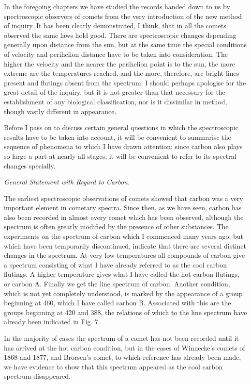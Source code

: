 \documentclass[a4paper, 12pt, oneside, polutonikogreek, english]{article}
\begin{document}
In the foregoing chapters we have studied the records handed down to us by spectroscopic observers of comets from the very introduction of the new method of inquiry. It has been clearly demonstrated, I think, that in all the comets observed the same laws hold good. There are spectroscopic changes depending generally upon distance from the sun, but at the same time the special conditions of velocity and perihelion distance have to be taken into consideration. The higher the velocity and the nearer the perihelion point is to the sun, the more extreme are the temperatures reached, and the more, therefore, are bright lines present and flutings absent from the spectrum. I should perhaps apologise for the great detail of the inquiry, but it is not greater than that necessary for the establishment of any biological classification, nor is it dissimilar in method, though vastly different in appearance.

Before I pass on to discuss certain general questions in which the spectroscopic results have to be taken into account, it will be convenient to summarise the sequence of phenomena to which I have drawn attention; since carbon also plays so large a part at nearly all stages, it will be convenient to refer to its spectral changes specially.

\emph{General Statement with Regard to Carbon.}

The earliest spectroscopic observations of comets showed that carbon was a very important element in cometary spectra. Since then, as we have seen, carbon has also been recorded in almost every comet which has been observed, although the spectrum is often greatly modified by the presence of other substances. The experiments on the spectrum of carbon which I commenced many years ago, but which have been temporarily discontinued, indicate that there are several distinct changes in the spectrum. At very low temperatures all compounds of carbon give a spectrum consisting of what I have already referred to as the cool carbon flutings. A higher temperature gives what I have called the hot carbon flutings, or carbon A. Finally we get the line spectrum of carbon. Another condition, which is not yet completely understood, is marked by the appearance of a group beginning at 460, which I have called carbon B. Associated with this are the groups beginning at 420 and 388, the relations of which to the line spectrum have already been indicated in Fig. 7.

In the majority of cases the spectrum of a comet has not been recorded until it has arrived at the hot carbon condition, but in the cases of Winnecke's comets of 1868 and 1877, and Brorsen's comet, to which reference has already been made, we have evidence to show that this spectrum appeared as the cool carbon spectrum disappeared.
\end{document}
